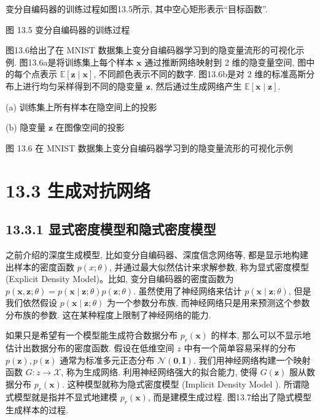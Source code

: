 \documentclass[10pt]{article}
\begin{document}
变分自编码器的训练过程如图13.5所示, 其中空心矩形表示“目标函数”.



图 13.5 变分自编码器的训练过程

图13.6给出了在 MNIST 数据集上变分自编码器学习到的隐变量流形的可视化示例. 图13.6a是将训练集上每个样本 $\boldsymbol{x}$ 通过推断网络映射到 2 维的隐变量空间, 图中的每个点表示 $\mathbb{E}[\boldsymbol{z} \mid \boldsymbol{x}]$, 不同颜色表示不同的数字. 图13.6b是对 2 维的标准高斯分布上进行均匀采样得到不同的隐变量 $\boldsymbol{z}$, 然后通过生成网络产生 $\mathbb{E}[\boldsymbol{x} \mid \boldsymbol{z}]$.



(a) 训练集上所有样本在隐空间上的投影



(b) 隐变量 $\boldsymbol{z}$ 在图像空间的投影

图 13.6 在 MNIST 数据集上变分自编码器学习到的隐变量流形的可视化示例

\section*{13.3 生成对抗网络}
\subsection*{13.3.1 显式密度模型和隐式密度模型}
之前介绍的深度生成模型, 比如变分自编码器、深度信念网络等, 都是显示地构建出样本的密度函数 $p(x ; \theta)$, 并通过最大似然估计来求解参数, 称为显式密度模型 (Explicit Density Model)。比如, 变分自编码器的密度函数为 $p(\boldsymbol{x}, \boldsymbol{z} ; \theta)=p(\boldsymbol{x} \mid \boldsymbol{z} ; \theta) p(\boldsymbol{z} ; \theta)$. 虽然使用了神经网络来估计 $p(\boldsymbol{x} \mid \boldsymbol{z} ; \theta)$, 但是我们依然假设 $p(\boldsymbol{x} \mid \boldsymbol{z} ; \theta)$ 为一个参数分布族, 而神经网络只是用来预测这个参数分布族的参数. 这在某种程度上限制了神经网络的能力.

如果只是希望有一个模型能生成符合数据分布 $p_{r}(\boldsymbol{x})$ 的样本, 那么可以不显示地估计出数据分布的密度函数. 假设在低维空间 $z$ 中有一个简单容易采样的分布 $p(\boldsymbol{z}), p(\boldsymbol{z})$ 通常为标准多元正态分布 $\mathcal{N}(\mathbf{0}, \boldsymbol{I})$. 我们用神经网络构建一个映射函数 $G: z \rightarrow \mathcal{X}$, 称为生成网络. 利用神经网络强大的拟合能力, 使得 $G(\boldsymbol{z})$ 服从数据分布 $p_{r}(\boldsymbol{x})$. 这种模型就称为隐式密度模型 (Implicit Density Model ). 所谓隐式模型就是指并不显式地建模 $p_{r}(\boldsymbol{x})$, 而是建模生成过程. 图13.7给出了隐式模型生成样本的过程.
\end{document}
